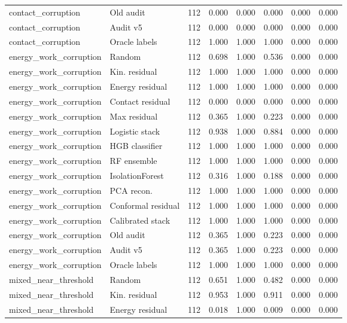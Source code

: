 {\begin{longtable}{llrrrrrr}
contact\_corruption & Old audit & 112 & 0.000 & 0.000 & 0.000 & 0.000 & 0.000 \\
contact\_corruption & Audit v5 & 112 & 0.000 & 0.000 & 0.000 & 0.000 & 0.000 \\
contact\_corruption & Oracle labels & 112 & 1.000 & 1.000 & 1.000 & 0.000 & 0.000 \\
energy\_work\_corruption & Random & 112 & 0.698 & 1.000 & 0.536 & 0.000 & 0.000 \\
energy\_work\_corruption & Kin. residual & 112 & 1.000 & 1.000 & 1.000 & 0.000 & 0.000 \\
energy\_work\_corruption & Energy residual & 112 & 1.000 & 1.000 & 1.000 & 0.000 & 0.000 \\
energy\_work\_corruption & Contact residual & 112 & 0.000 & 0.000 & 0.000 & 0.000 & 0.000 \\
energy\_work\_corruption & Max residual & 112 & 0.365 & 1.000 & 0.223 & 0.000 & 0.000 \\
energy\_work\_corruption & Logistic stack & 112 & 0.938 & 1.000 & 0.884 & 0.000 & 0.000 \\
energy\_work\_corruption & HGB classifier & 112 & 1.000 & 1.000 & 1.000 & 0.000 & 0.000 \\
energy\_work\_corruption & RF ensemble & 112 & 1.000 & 1.000 & 1.000 & 0.000 & 0.000 \\
energy\_work\_corruption & IsolationForest & 112 & 0.316 & 1.000 & 0.188 & 0.000 & 0.000 \\
energy\_work\_corruption & PCA recon. & 112 & 1.000 & 1.000 & 1.000 & 0.000 & 0.000 \\
energy\_work\_corruption & Conformal residual & 112 & 1.000 & 1.000 & 1.000 & 0.000 & 0.000 \\
energy\_work\_corruption & Calibrated stack & 112 & 1.000 & 1.000 & 1.000 & 0.000 & 0.000 \\
energy\_work\_corruption & Old audit & 112 & 0.365 & 1.000 & 0.223 & 0.000 & 0.000 \\
energy\_work\_corruption & Audit v5 & 112 & 0.365 & 1.000 & 0.223 & 0.000 & 0.000 \\
energy\_work\_corruption & Oracle labels & 112 & 1.000 & 1.000 & 1.000 & 0.000 & 0.000 \\
mixed\_near\_threshold & Random & 112 & 0.651 & 1.000 & 0.482 & 0.000 & 0.000 \\
mixed\_near\_threshold & Kin. residual & 112 & 0.953 & 1.000 & 0.911 & 0.000 & 0.000 \\
mixed\_near\_threshold & Energy residual & 112 & 0.018 & 1.000 & 0.009 & 0.000 & 0.000 \\

\end{longtable}}
